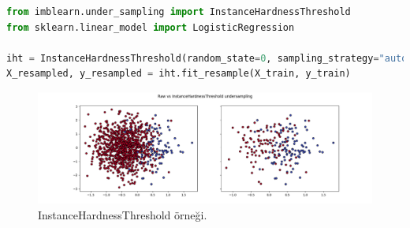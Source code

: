 \begin{lstlisting}[language=Python]
from imblearn.under_sampling import InstanceHardnessThreshold
from sklearn.linear_model import LogisticRegression

iht = InstanceHardnessThreshold(random_state=0, sampling_strategy="auto", estimator=LogisticRegression())
X_resampled, y_resampled = iht.fit_resample(X_train, y_train)
\end{lstlisting}

\begin{figure}[h]
    \centering
    \includegraphics[width=1\textwidth]{images/Raw vs InstanceHardnessThreshold undersampling.png}
    \caption{InstanceHardnessThreshold örneği.}
    \label{fig:enter-label}
\end{figure}

\newpage